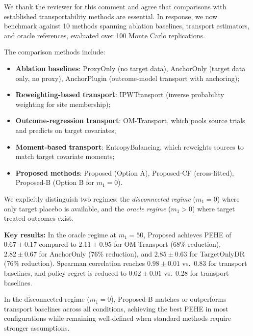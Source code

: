 {\color{blue}

We thank the reviewer for this comment and agree that comparisons with established transportability methods are essential. In response, we now benchmark against 10 methods spanning ablation baselines, transport estimators, and oracle references, evaluated over 100 Monte Carlo replications.

The comparison methods include:
\begin{itemize}
\item \textbf{Ablation baselines}: ProxyOnly (no target data), AnchorOnly (target data only, no proxy), AnchorPlugin (outcome-model transport with anchoring);
\item \textbf{Reweighting-based transport}: IPWTransport (inverse probability weighting for site membership);
\item \textbf{Outcome-regression transport}: OM-Transport, which pools source trials and predicts on target covariates;
\item \textbf{Moment-based transport}: EntropyBalancing, which reweights sources to match target covariate moments;
\item \textbf{Proposed methods}: Proposed (Option A), Proposed-CF (cross-fitted), Proposed-B (Option B for $m_1=0$).
\end{itemize}

We explicitly distinguish two regimes: the \emph{disconnected regime} ($m_1=0$) where only target placebo is available, and the \emph{oracle regime} ($m_1>0$) where target treated outcomes exist.

\textbf{Key results:} In the oracle regime at $m_1=50$, Proposed achieves PEHE of $0.67 \pm 0.17$ compared to $2.11 \pm 0.95$ for OM-Transport (68\% reduction), $2.82 \pm 0.67$ for AnchorOnly (76\% reduction), and $2.85 \pm 0.63$ for TargetOnlyDR (76\% reduction). Spearman correlation reaches $0.98 \pm 0.01$ vs.\ $0.83$ for transport baselines, and policy regret is reduced to $0.02 \pm 0.01$ vs.\ $0.28$ for transport baselines.

In the disconnected regime ($m_1=0$), Proposed-B matches or outperforms transport baselines across all conditions, achieving the best PEHE in most configurations while remaining well-defined when standard methods require stronger assumptions.
}



\clearpage